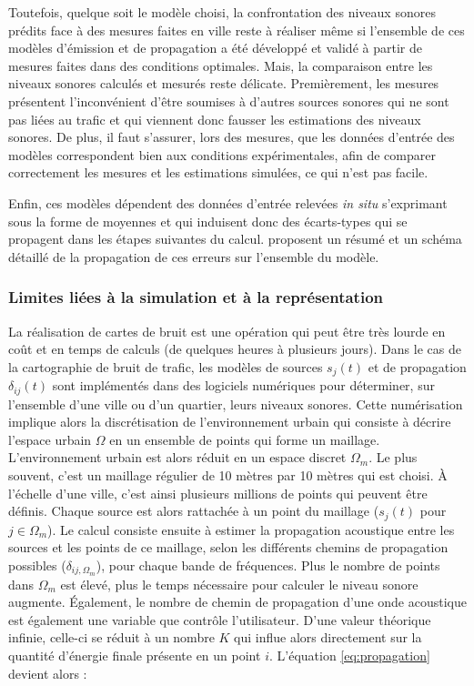 Toutefois, quelque soit le modèle choisi, la confrontation des niveaux sonores prédits face à des mesures faites en ville reste à réaliser même si l'ensemble de ces modèles d'émission et de propagation a été développé et validé à partir de mesures faites dans des conditions optimales. Mais, la comparaison entre les niveaux sonores calculés et mesurés reste délicate. Premièrement, les mesures présentent l'inconvénient d'être soumises à d'autres sources sonores qui ne sont pas liées au trafic et qui viennent donc fausser les estimations des niveaux sonores. De plus, il faut s'assurer, lors des mesures, que les données d'entrée des modèles correspondent bien aux conditions expérimentales, afin de comparer correctement les mesures et les estimations simulées, ce qui n'est pas facile.

Enfin, ces modèles dépendent des données d'entrée relevées \textit{in situ} s'exprimant sous la forme de moyennes et qui induisent donc des écarts-types qui se propagent dans les étapes suivantes du calcul. \cite{van_leeuwen_noise_2015} proposent un résumé et un schéma détaillé de la propagation de ces erreurs sur l'ensemble du modèle.

\subsubsection{Limites liées à la simulation et à la représentation}

La réalisation de cartes de bruit est une opération qui peut être très lourde en coût et en temps de calculs (de quelques heures à plusieurs jours).
Dans le cas de la cartographie de bruit de trafic, les modèles de sources $s_j(t)$ et de propagation $\delta_{ij}(t)$ sont implémentés dans des logiciels numériques pour déterminer, sur l'ensemble d'une ville ou d'un quartier, leurs niveaux sonores. Cette numérisation implique alors la discrétisation de l'environnement urbain qui consiste à décrire l'espace urbain $\Omega$ en un ensemble de points qui forme un maillage. L'environnement urbain est alors réduit en un espace discret $\Omega_m$. Le plus souvent, c'est un maillage régulier de 10 mètres par 10 mètres qui est choisi. À l'échelle d'une ville, c'est ainsi plusieurs millions de points qui peuvent être définis. Chaque source est alors rattachée à un point du maillage ($s_{j}(t)$ pour $j\in\Omega_m$). Le calcul consiste ensuite à estimer la propagation acoustique entre les sources et les points de ce maillage, selon les différents chemins de propagation possibles ($\delta_{ij,\Omega_m}$), pour chaque bande de fréquences. Plus le nombre de points dans $\Omega_{m}$ est élevé, plus le temps nécessaire pour calculer le niveau sonore augmente.  
Également, le nombre de chemin de propagation d'une onde acoustique est également une variable que contrôle l'utilisateur. D'une valeur théorique infinie, celle-ci se réduit à un nombre $K$ qui influe alors directement sur la quantité d'énergie finale présente en un point $i$. L'équation \ref{eq:propagation} devient alors : 

